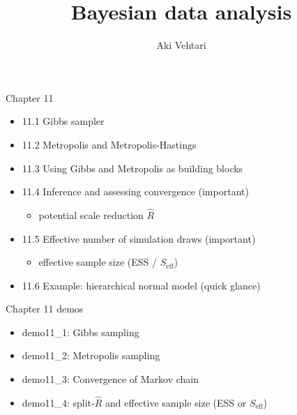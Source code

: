 \documentclass[finnish,english,t]{beamer}
\title[]{Bayesian data analysis}
\subtitle{}
\author{Aki Vehtari}
\institute[Aalto]{}
\def\eff{\text{eff}}
\def\Seff{S_\eff}
\begin{document}

\begin{frame}{Chapter 11}

  \begin{itemize}
  \item 11.1 Gibbs sampler
  \item 11.2 Metropolis and Metropolis-Hastings
  \item 11.3 Using Gibbs and Metropolis as building blocks
  \item 11.4 Inference and assessing convergence (important)
    \begin{itemize}
    \item potential scale reduction $\widehat{R}$
    \end{itemize}
  \item 11.5 Effective number of simulation draws (important)
    \begin{itemize}
    \item effective sample size (ESS / $\Seff$)
    \end{itemize}
  \item 11.6 Example: hierarchical normal model (quick glance)
  \end{itemize}
\end{frame}

\begin{frame}{Chapter 11 demos}

  \begin{itemize}
\item demo11\_1: Gibbs sampling
\item demo11\_2: Metropolis sampling
\item demo11\_3: Convergence of Markov chain
\item demo11\_4: split-$\widehat{R}$ and effective sample size (ESS or $\Seff$)
\end{itemize}

\end{frame}
\end{document}
